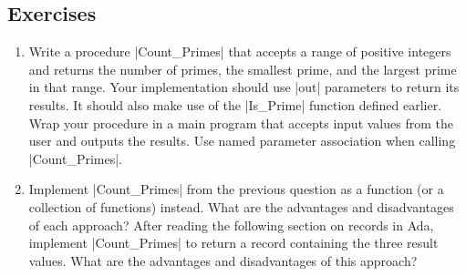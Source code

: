 \subsection*{Exercises}

\begin{enumerate}
\item Write a procedure |Count_Primes| that accepts a range of positive integers and returns the
  number of primes, the smallest prime, and the largest prime in that range. Your implementation
  should use |out| parameters to return its results. It should also make use of the |Is_Prime|
  function defined earlier. Wrap your procedure in a main program that accepts input values from
  the user and outputs the results. Use named parameter association when calling |Count_Primes|.

\item Implement |Count_Primes| from the previous question as a function (or a collection of
  functions) instead. What are the advantages and disadvantages of each approach? After reading
  the following section on records in Ada, implement |Count_Primes| to return a record
  containing the three result values. What are the advantages and disadvantages of this
  approach?
\end{enumerate}

